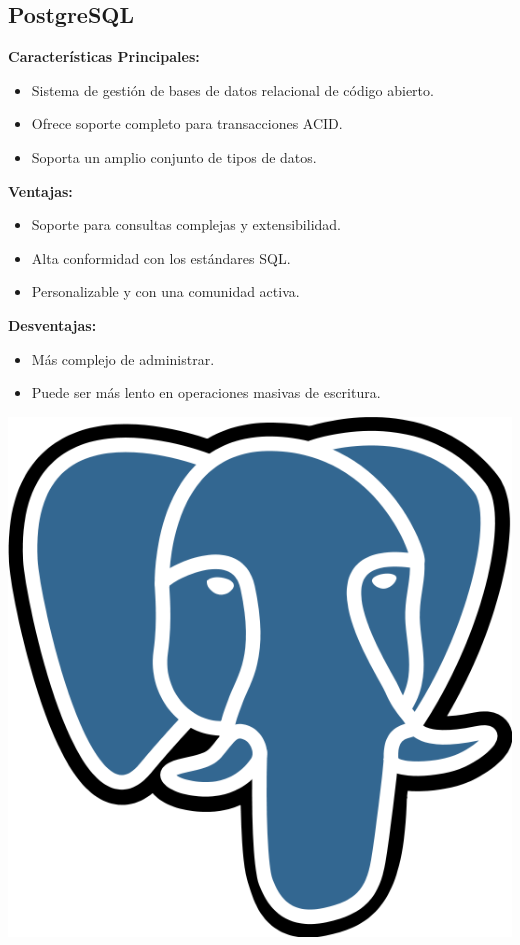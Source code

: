 \documentclass{article}
\begin{document}
\subsection{PostgreSQL}
\textbf{Características Principales:}
\begin{itemize}
    \item Sistema de gestión de bases de datos relacional de código abierto.
    \item Ofrece soporte completo para transacciones ACID.
    \item Soporta un amplio conjunto de tipos de datos.
\end{itemize}
\textbf{Ventajas:}
\begin{itemize}
    \item Soporte para consultas complejas y extensibilidad.
    \item Alta conformidad con los estándares SQL.
    \item Personalizable y con una comunidad activa.
\end{itemize}
\textbf{Desventajas:}
\begin{itemize}
    \item Más complejo de administrar.
    \item Puede ser más lento en operaciones masivas de escritura.
\end{itemize}
\includegraphics[width=\linewidth]{postgresql.png}
\end{document}
